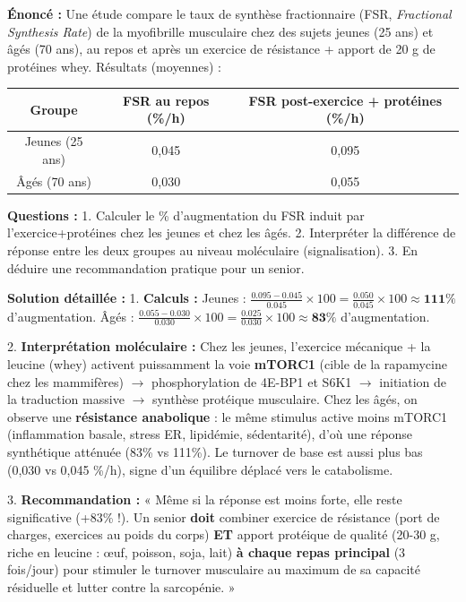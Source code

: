 \documentclass[11pt]{article}
\begin{document}
\begin{exoresolu}
\textbf{Énoncé :} Une étude compare le taux de synthèse fractionnaire (FSR, \emph{Fractional Synthesis Rate}) de la myofibrille musculaire chez des sujets jeunes (25 ans) et âgés (70 ans), au repos et après un exercice de résistance + apport de 20 g de protéines whey. Résultats (moyennes) :
\begin{center}
\begin{tabular}{|c|c|c|}
\hline
\rowcolor{popblueL} \textbf{Groupe} & \textbf{FSR au repos (\%/h)} & \textbf{FSR post-exercice + protéines (\%/h)} \\
\hline
Jeunes (25 ans) & 0,045 & 0,095 \\
\hline
Âgés (70 ans) & 0,030 & 0,055 \\
\hline
\end{tabular}
\end{center}
\textbf{Questions :}
1. Calculer le \% d'augmentation du FSR induit par l'exercice+protéines chez les jeunes et chez les âgés.
2. Interpréter la différence de réponse entre les deux groupes au niveau moléculaire (signalisation).
3. En déduire une recommandation pratique pour un senior.

\tcblower
\textbf{Solution détaillée :}
1. \textbf{Calculs :}
Jeunes : $\frac{0.095 - 0.045}{0.045} \times 100 = \frac{0.050}{0.045} \times 100 \approx \textbf{111\%}$ d'augmentation.
Âgés : $\frac{0.055 - 0.030}{0.030} \times 100 = \frac{0.025}{0.030} \times 100 \approx \textbf{83\%}$ d'augmentation.

2. \textbf{Interprétation moléculaire :} Chez les jeunes, l'exercice mécanique + la leucine (whey) activent puissamment la voie \textbf{mTORC1} (cible de la rapamycine chez les mammifères) $\rightarrow$ phosphorylation de 4E-BP1 et S6K1 $\rightarrow$ initiation de la traduction massive $\rightarrow$ synthèse protéique musculaire. Chez les âgés, on observe une \textbf{résistance anabolique} : le même stimulus active moins mTORC1 (inflammation basale, stress ER, lipidémie, sédentarité), d'où une réponse synthétique atténuée (83\% vs 111\%). Le turnover de base est aussi plus bas (0,030 vs 0,045 \%/h), signe d'un équilibre déplacé vers le catabolisme.

3. \textbf{Recommandation :} « Même si la réponse est moins forte, elle reste significative (+83\% !). Un senior \textbf{doit} combiner exercice de résistance (port de charges, exercices au poids du corps) \textbf{ET} apport protéique de qualité (20-30 g, riche en leucine : œuf, poisson, soja, lait) \textbf{à chaque repas principal} (3 fois/jour) pour stimuler le turnover musculaire au maximum de sa capacité résiduelle et lutter contre la sarcopénie. »
\end{exoresolu}
\end{document}

